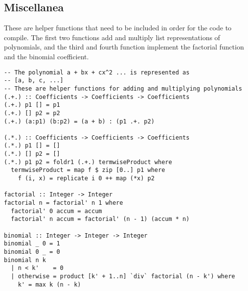 \subsection{Miscellanea}
These are helper functions that need to be included in order for the
code to compile. The first two functions add and multiply list representations
of polynomials, and the third and fourth function implement the factorial
function and the binomial coefficient.
\begin{singlespace}\begin{verbatim}
-- The polynomial a + bx + cx^2 ... is represented as
-- [a, b, c, ...]
-- These are helper functions for adding and multiplying polynomials
(.+.) :: Coefficients -> Coefficients -> Coefficients
(.+.) p1 [] = p1
(.+.) [] p2 = p2
(.+.) (a:p1) (b:p2) = (a + b) : (p1 .+. p2)

(.*.) :: Coefficients -> Coefficients -> Coefficients
(.*.) p1 [] = []
(.*.) [] p2 = []
(.*.) p1 p2 = foldr1 (.+.) termwiseProduct where
  termwiseProduct = map f $ zip [0..] p1 where
    f (i, x) = replicate i 0 ++ map (*x) p2

factorial :: Integer -> Integer
factorial n = factorial' n 1 where
  factorial' 0 accum = accum
  factorial' n accum = factorial' (n - 1) (accum * n)

binomial :: Integer -> Integer -> Integer
binomial _ 0 = 1
binomial 0 _ = 0
binomial n k
  | n < k'    = 0
  | otherwise = product [k' + 1..n] `div` factorial (n - k') where
    k' = max k (n - k)
\end{verbatim}\end{singlespace}
